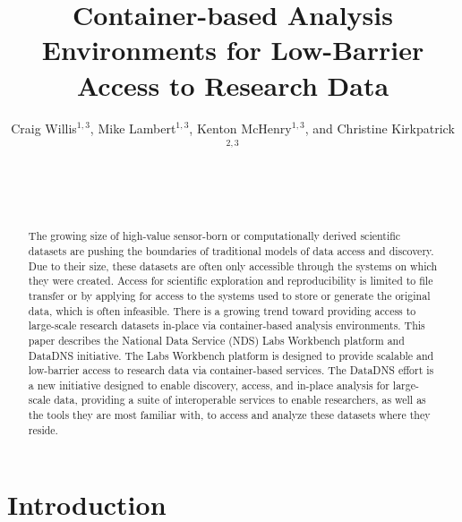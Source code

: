 \documentclass{sig-alternate}
\begin{document}
\sloppy
{}

\author{
Craig Willis$^{1,3}$, Mike Lambert$^{1,3}$, Kenton McHenry$^{1,3}$, and Christine Kirkpatrick$^{2,3}$\\
     \\     
     \\     
     \\     
}

\title{Container-based Analysis Environments for Low-Barrier Access to Research Data}

\maketitle
\begin{abstract}

The growing size of high-value sensor-born or computationally derived scientific datasets are pushing the boundaries of traditional models of data access and discovery. Due to their size, these datasets are often only accessible through the systems on which they were created. Access for scientific exploration and reproducibility is limited to file transfer or by applying for access to the systems used to store or generate the original data, which is often infeasible. There is a growing trend toward providing access to large-scale research datasets in-place via container-based analysis environments. This paper describes the National Data Service (NDS) Labs Workbench platform and DataDNS initiative. The Labs Workbench platform is designed to provide scalable and low-barrier access to research data via container-based services. The DataDNS effort is a new initiative designed to enable discovery, access, and in-place analysis for large-scale data, providing a suite of interoperable services to enable researchers, as well as the tools they are most familiar with, to access and analyze these datasets where they reside.

\end{abstract}


\keywords{}

\section{Introduction}
\end{document}
